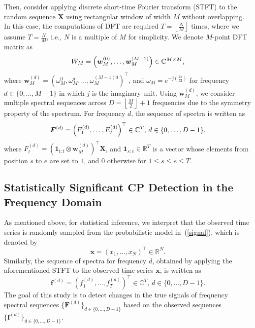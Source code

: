 Then, consider applying discrete short-time Fourier transform (STFT) to the random sequence $\bm{X}$ using rectangular window of width $M$ without overlapping.
%
In this case, the computations of DFT are required $T = \left\lfloor \frac{N}{M} \right\rfloor$ times, where we assume $T = \frac{N}{M}$, i.e., $N$ is a multiple of $M$ for simplicity.
%
We denote $M$-point DFT matrix as
\begin{equation}
  W_{M} = \left(\bm{w}_M^{(0)}, \dots, \bm{w}_M^{(M-1)}\right) \in \mathbb{C}^{M \times M}, \notag
\end{equation}
where $\bm{w}_M^{(d)} = \left(\omega_M^0, \omega_M^d, \dots, \omega_M^{(M-1)d}\right)^\top$, and $\omega_M = e^{-j \left(\frac{2\pi}{M}\right)}$ for frequency $d \in \{0, \dots, M-1\}$ in which $j$ is the imaginary unit.
%
Using $\bm{w}_M^{(d)}$, we consider multiple spectral sequences across $D = \left\lfloor\frac{M}{2} \right\rfloor + 1$ frequencies due to the symmetry property of the spectrum.
%
For frequency $d$,
the sequence of spectra is written as
\begin{equation}
  \bm{F}^{(d)} = \left({F}_1^{(d)}, \dots, {F}_T^{(d)}\right)^\top \in \mathbb{C}^T, \, d \in \{0, \ldots, D-1\}, \notag %
\end{equation}
where ${F}_t^{(d)} = \left(\bm{1}_{t:t} \otimes \bm{w}_M^{(d)}\right)^\top \bm{X}$, and $\bm{1}_{s:e} \in \mathbb{R}^T$ is a vector whose elements from position $s$ to $e$ are set to $1$, and $0$ otherwise for $1 \leq s \leq e \leq T$.

\subsection{Statistically Significant CP Detection in the Frequency Domain}
%
As mentioned above, for statistical inference, we interpret that the observed time series is randomly sampled from the probabilistic model in~(\ref{signal}), which is denoted by
\begin{equation}
 \bm{x} = (x_1, \dots, x_N)^\top \in \mathbb{R}^N. \label{eq:observedX} %
\end{equation}
%
Similarly, the sequence of spectra for frequency $d$, obtained by applying the aforementioned STFT to the observed time series $\bm{x}$, is written as
\begin{equation}
\bm{f}^{(d)} = \left({f}_1^{(d)}, \dots, {f}_T^{(d)}\right)^\top \in \mathbb{C}^T, \, d \in \{0, \dots, D-1\}. \label{eq:observedF}
\end{equation}
%
The goal of this study is to detect changes in the true signals of frequency spectral sequences $\{\bm{F}^{(d)}\}_{d \in \{0, \ldots, D-1\}}$ based on the observed sequences $\{\bm{f}^{(d)}\}_{d \in \{0, \ldots, D-1\}}$.

